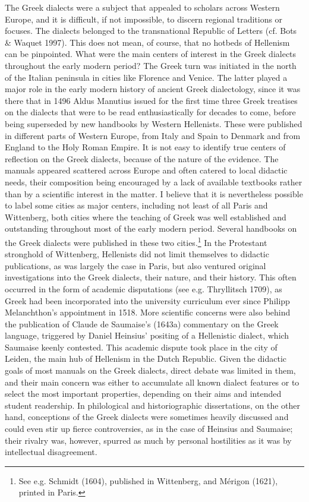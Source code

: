 \begin{styleStandard}
The Greek dialects were a subject that appealed to scholars across Western Europe, and it is difficult, if not impossible, to discern regional traditions or focuses. The dialects belonged to the transnational Republic of Letters (cf. Bots \& Waquet 1997). This does not mean, of course, that no hotbeds of Hellenism can be pinpointed. What were the main centers of interest in the Greek dialects throughout the early modern period? The Greek turn was initiated in the north of the Italian peninsula in cities like Florence and Venice. The latter played a major role in the early modern history of ancient Greek dialectology, since it was there that in 1496 Aldus Manutius issued for the first time three Greek treatises on the dialects that were to be read enthusiastically for decades to come, before being superseded by new handbooks by Western Hellenists. These were published in different parts of Western Europe, from Italy and Spain to Denmark and from England to the Holy Roman Empire. It is not easy to identify true centers of reflection on the Greek dialects, because of the nature of the evidence. The manuals appeared scattered across Europe and often catered to local didactic needs, their composition being encouraged by a lack of available textbooks rather than by a scientific interest in the matter. I believe that it is nevertheless possible to label some cities as major centers, including not least of all Paris and Wittenberg, both cities where the teaching of Greek was well established and outstanding throughout most of the early modern period. Several handbooks on the Greek dialects were published in these two cities.\footnote{ See e.g. Schmidt (1604), published in Wittenberg, and Mérigon (1621), printed in Paris.} In the Protestant stronghold of Wittenberg, Hellenists did not limit themselves to didactic publications, as was largely the case in Paris, but also ventured original investigations into the Greek dialects, their nature, and their history. This often occurred in the form of academic disputations (see e.g. Thryllitsch 1709), as Greek had been incorporated into the university curriculum ever since Philipp Melanchthon’s appointment in 1518. More scientific concerns were also behind the publication of Claude de Saumaise’s (1643a) commentary on the Greek language, triggered by Daniel Heinsius’ positing of a Hellenistic dialect, which Saumaise keenly contested. This academic dispute took place in the city of Leiden, the main hub of Hellenism in the Dutch Republic. Given the didactic goals of most manuals on the Greek dialects, direct debate was limited in them, and their main concern was either to accumulate all known dialect features or to select the most important properties, depending on their aims and intended student readership. In philological and historiographic dissertations, on the other hand, conceptions of the Greek dialects were sometimes heavily discussed and could even stir up fierce controversies, as in the case of Heinsius and Saumaise; their rivalry was, however, spurred as much by personal hostilities as it was by intellectual disagreement.
\end{styleStandard}

